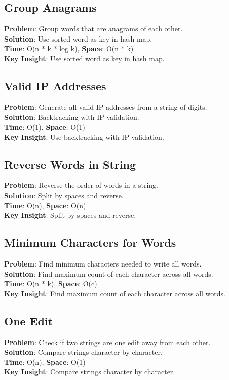 \documentclass{report}
\begin{document}
\subsection{Group Anagrams}
\textbf{Problem}: Group words that are anagrams of each other.\\
\textbf{Solution}: Use sorted word as key in hash map.\\
\textbf{Time}: O(n * k * log k), \textbf{Space}: O(n * k)\\
\textbf{Key Insight}: Use sorted word as key in hash map.

\subsection{Valid IP Addresses}
\textbf{Problem}: Generate all valid IP addresses from a string of digits.\\
\textbf{Solution}: Backtracking with IP validation.\\
\textbf{Time}: O(1), \textbf{Space}: O(1)\\
\textbf{Key Insight}: Use backtracking with IP validation.

\subsection{Reverse Words in String}
\textbf{Problem}: Reverse the order of words in a string.\\
\textbf{Solution}: Split by spaces and reverse.\\
\textbf{Time}: O(n), \textbf{Space}: O(n)\\
\textbf{Key Insight}: Split by spaces and reverse.

\subsection{Minimum Characters for Words}
\textbf{Problem}: Find minimum characters needed to write all words.\\
\textbf{Solution}: Find maximum count of each character across all words.\\
\textbf{Time}: O(n * k), \textbf{Space}: O(c)\\
\textbf{Key Insight}: Find maximum count of each character across all words.

\subsection{One Edit}
\textbf{Problem}: Check if two strings are one edit away from each other.\\
\textbf{Solution}: Compare strings character by character.\\
\textbf{Time}: O(n), \textbf{Space}: O(1)\\
\textbf{Key Insight}: Compare strings character by character.
\end{document}
